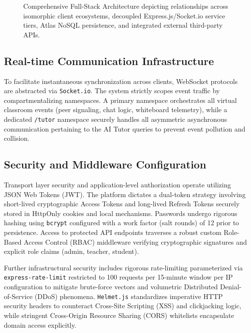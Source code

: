 \documentclass[12pt, journal, onecolumn]{IEEEtran}
\begin{document}
\begin{figure}[htbp]
\caption{Comprehensive Full-Stack Architecture depicting relationships across isomorphic client ecosystems, decoupled Express.js/Socket.io service tiers, Atlas NoSQL persistence, and integrated external third-party APIs.}
\label{fig:comprehensive_arch}
\end{figure}

\subsection{Real-time Communication Infrastructure}
To facilitate instantaneous synchronization across clients, WebSocket protocols are abstracted via \texttt{Socket.io}. The system strictly scopes event traffic by compartmentalizing namespaces. A primary namespace orchestrates all virtual classroom events (peer signaling, chat logic, whiteboard telemetry), while a dedicated \texttt{/tutor} namespace securely handles all asymmetric asynchronous communication pertaining to the AI Tutor queries to prevent event pollution and collision.

\subsection{Security and Middleware Configuration}
Transport layer security and application-level authorization operate utilizing JSON Web Tokens (JWT). The platform dictates a dual-token strategy involving short-lived cryptographic Access Tokens and long-lived Refresh Tokens securely stored in HttpOnly cookies and local mechanisms. Passwords undergo rigorous hashing using \texttt{bcrypt} configured with a work factor (salt rounds) of 12 prior to persistence. Access to protected API endpoints traverses a robust custom Role-Based Access Control (RBAC) middleware verifying cryptographic signatures and explicit role claims (admin, teacher, student). 

Further infrastructural security includes rigorous rate-limiting parameterized via \texttt{express-rate-limit} restricted to 100 requests per 15-minute window per IP configuration to mitigate brute-force vectors and volumetric Distributed Denial-of-Service (DDoS) phenomena. \texttt{Helmet.js} standardizes imperative HTTP security headers to counteract Cross-Site Scripting (XSS) and clickjacking logic, while stringent Cross-Origin Resource Sharing (CORS) whitelists encapsulate domain access explicitly.
\end{document}
